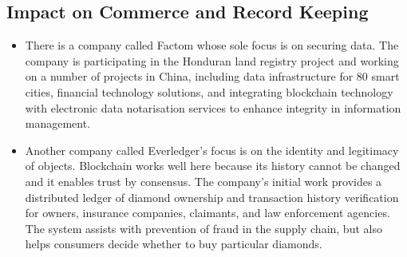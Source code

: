 \subsection{Impact on Commerce and Record Keeping}
\begin{itemize}
    \item There is a company called Factom whose sole focus is on securing data. The company is participating in the Honduran land registry project and working on a number of projects in China, including data infrastructure for 80 smart cities, financial technology solutions, and integrating blockchain technology with electronic data notarisation services to enhance integrity in information management. 
    \item Another company called Everledger’s focus is on the identity and legitimacy of objects. Blockchain works well here because its history cannot be changed and it enables trust by consensus. The company’s initial work provides a distributed ledger of diamond ownership and transaction history verification for owners, insurance companies, claimants, and law enforcement agencies. The system assists with prevention of fraud in the supply chain, but also helps consumers decide whether to buy particular diamonds.
\end{itemize}

